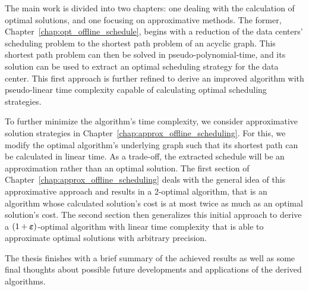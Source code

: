 The main work is divided into two chapters: one dealing with the calculation of optimal solutions, and one focusing on approximative methods. The former, Chapter~\ref{chap:opt_offline_schedule}, begins with a reduction of the data centers' scheduling problem to the shortest path problem of an acyclic graph. This shortest path problem can then be solved in pseudo-polynomial-time, and its solution can be used to extract an optimal scheduling strategy for the data center. This first approach is further refined to derive an improved algorithm with pseudo-linear time complexity capable of calculating optimal scheduling strategies. 

To further minimize the algorithm's time complexity, we consider approximative solution strategies in Chapter~\ref{chap:approx_offline_scheduling}. For this, we modify the optimal algorithm's underlying graph such that its shortest path can be calculated in linear time. As a trade-off, the extracted schedule will be an approximation rather than an optimal solution. The first section of Chapter~\ref{chap:approx_offline_scheduling} deals with the general idea of this approximative approach and results in a 2-optimal algorithm, that is an algorithm whose calculated solution's cost is at most twice as much as an optimal solution's cost. The second section then generalizes this initial approach to derive a $(1+\boldsymbol\varepsilon)$-optimal algorithm with linear time complexity that is able to approximate optimal solutions with arbitrary precision.

The thesis finishes with a brief summary of the achieved results as well as some final thoughts about possible future developments and applications of the derived algorithms.
